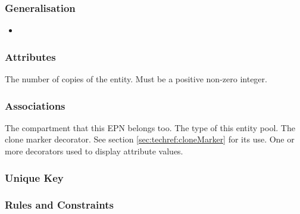 \subsubsection{Generalisation}

\begin{itemize}
\item {}
\end{itemize}

\subsubsection{Attributes}

\begin{attributes}
   The number of copies of the entity. Must
  be a positive non-zero integer.
\end{attributes}

\subsubsection{Associations}

\begin{attributes}
  The compartment
  that this EPN belongs too.
 The type of this entity pool.
   The clone marker
  decorator. See section \ref{sec:techref:cloneMarker} for its use.
  One or
 more decorators used to display attribute values.
\end{attributes}

\subsubsection{Unique Key}

\begin{logicalkey}
\item {}
\item {}
\item {}
\end{logicalkey}

\subsubsection{Rules and Constraints}

